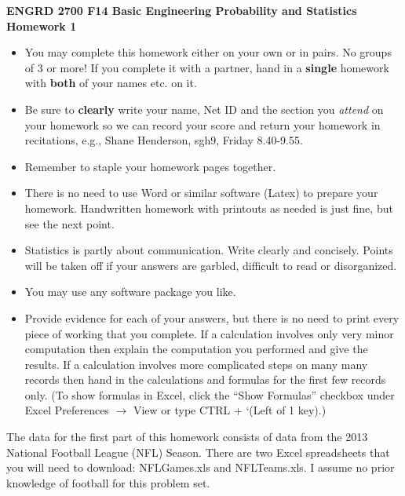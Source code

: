 \documentclass{article}    %
\begin{document}


\begin{center}
\textbf{ENGRD 2700 F14 Basic Engineering Probability and Statistics}\\[.1cm]

\textbf{Homework 1}
\end{center}

\begin{itemize}
\item You may complete this homework either on your own or in pairs. No groups of 3 or more! If you complete it with a partner, hand in a \textbf{single} homework with \textbf{both} of your names etc. on it.
\item Be sure to \textbf{clearly} write your name, Net ID and the section you {\em attend} on
  your homework so we can record your score and return your homework in recitations, e.g., Shane Henderson, sgh9, Friday 8.40-9.55.
\item Remember to staple your homework pages together.
\item There is no need to use Word or similar software (Latex) to prepare your homework. Handwritten homework with printouts as needed is just fine, but see the next point.
\item Statistics is partly about communication. Write clearly and concisely. Points will be taken off if your answers are garbled, difficult to read or disorganized.
\item You may use any software package you like.
\item Provide evidence for each of your answers, but there is no need to print every piece of working that you complete. If a calculation involves only very minor computation then explain the computation you performed and give the results. If a calculation involves more complicated steps on many many records then hand in the calculations and formulas for the first few records only. (To show formulas in Excel, click the ``Show Formulas'' checkbox under Excel Preferences $\rightarrow$ View or type CTRL + `(Left of 1 key).)
\end{itemize}

\medskip

The data for the first part of this homework consists of data from the 2013 National Football League (NFL) Season.  There are two Excel spreadsheets that you will need to download: NFLGames.xls and NFLTeams.xls.  I assume no prior knowledge of football for this problem set.  
\end{document}
